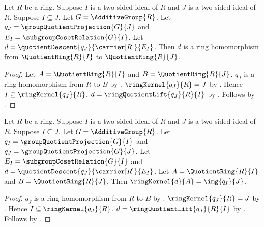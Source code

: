 \begin{theorem}\label{ring_quotient_comparison_hom}
    Let $R$ be a ring.
    Suppose $I$ is a two-sided ideal of $R$ and
        $J$ is a two-sided ideal of $R$.
    Suppose $I\subseteq J$.
    Let $G=\AdditiveGroup{R}$.
    Let $q_J=\groupQuotientProjection{G}{J}$ and
        $E_I=\subgroupCosetRelation{G}{I}$.
    Let $d=\quotientDescent{q_J}{\carrier[R]}{E_I}$.
    Then $d$ is a ring homomorphism from $\QuotientRing{R}{I}$ to
        $\QuotientRing{R}{J}$.
\end{theorem}
\begin{proof}
    Let $A=\QuotientRing{R}{I}$ and $B=\QuotientRing{R}{J}$.
    $q_J$ is a ring homomorphism from $R$ to $B$ by
        .
    $\ringKernel{q_J}{R}=J$ by
        .
    Hence $I\subseteq\ringKernel{q_J}{R}$.
    $d=\ringQuotientLift{q_J}{R}{I}$ by
        .
    Follows by .
\end{proof}

\begin{theorem}\label{ring_quotient_comparison_kernel}
    Let $R$ be a ring.
    Suppose $I$ is a two-sided ideal of $R$ and
        $J$ is a two-sided ideal of $R$.
    Suppose $I\subseteq J$.
    Let $G=\AdditiveGroup{R}$.
    Let $q_I=\groupQuotientProjection{G}{I}$ and
        $q_J=\groupQuotientProjection{G}{J}$.
    Let $E_I=\subgroupCosetRelation{G}{I}$ and
        $d=\quotientDescent{q_J}{\carrier[R]}{E_I}$.
    Let $A=\QuotientRing{R}{I}$ and $B=\QuotientRing{R}{J}$.
    Then $\ringKernel{d}{A}=\img{q_I}{J}$.
\end{theorem}
\begin{proof}
    $q_J$ is a ring homomorphism from $R$ to $B$ by
        .
    $\ringKernel{q_J}{R}=J$ by
        .
    Hence $I\subseteq\ringKernel{q_J}{R}$.
    $d=\ringQuotientLift{q_J}{R}{I}$ by
        .
    Follows by .
\end{proof}

